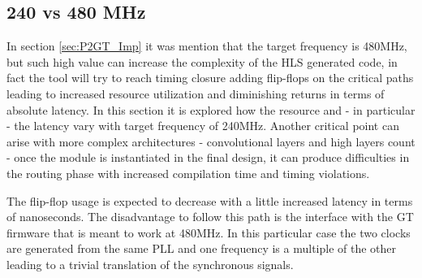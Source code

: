 \documentclass[../../main.tex]{subfiles}
\begin{document}
\vfill

\subsection{240 vs 480 MHz}
\label{sec:P2GT_clock test}

In section \ref{sec:P2GT_Imp} it was mention that the target frequency is 480MHz, but such high value can increase the complexity of the HLS generated code, in fact the tool will try to reach timing closure adding flip-flops on the critical paths leading to increased resource utilization and diminishing returns in terms of absolute latency. In this section it is explored how the resource and - in particular - the latency vary with target frequency of 240MHz. Another critical point can arise with more complex architectures - convolutional layers and high layers count - once the module is instantiated in the final design, it can produce difficulties in the routing phase with increased compilation time and timing violations.  

The flip-flop usage is expected to decrease with a little increased latency in terms of nanoseconds. The disadvantage to follow this path is the interface with the GT firmware that is meant to work at 480MHz. In this particular case the two clocks are generated from the same PLL and one frequency is a multiple of the other leading to a trivial translation of the synchronous signals.
\end{document}
